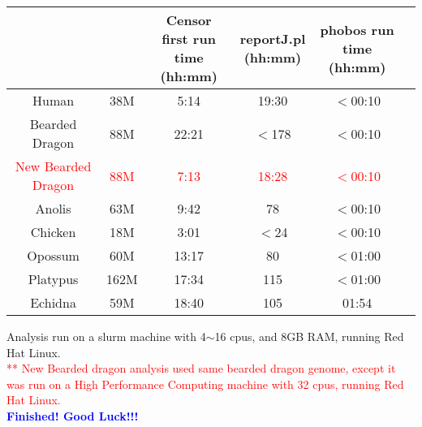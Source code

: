 \documentclass[12pt]{article}
\begin{document}
\footnotesize  %
\setlength\tabcolsep{1.5pt}
\begin{center}
	\begin{tabular}{ | c | c | c | c| c |c|}
		\hline
		\thead{Genome}	& 	\thead{Consensus sequences size}	&	\thead{Censor first run \\ time (hh:mm)}	&	\thead{reportJ.pl \\ (hh:mm)}	&	\thead{phobos run time \\ (hh:mm)} \\
		\hline
		Human	&	38M	&	5:14	&	19:30	&	$<$00:10 \\
		\hline 
		Bearded Dragon	&	88M	&	22:21	&	$<$178	&	$<$00:10 \\
		\hline
		\textcolor{red}{New Bearded Dragon}	&	\textcolor{red}{88M}	&	\textcolor{red}{7:13}	&	\textcolor{red}{18:28}	&	\textcolor{red}{$<$00:10} \\
		\hline
		Anolis	&	63M	&	9:42	&	78	&	$<$00:10 \\
		\hline
		Chicken	&	18M	&	3:01	&	$<$24	&	$<$00:10 \\
		\hline
		Opossum	&	60M	&	13:17	&	80	&	$<$01:00 \\
		\hline
		Platypus	&	162M	&	17:34	&	115	&	$<$01:00 \\
		\hline
		Echidna	&	59M	&	18:40	&	105	&	01:54 \\
		\hline
	\end{tabular}
\end{center}

\noindent * Analysis run on a slurm machine with 4$\sim$16 cpus, and 8GB RAM, running Red Hat Linux.\\
\textcolor{red}{** New Bearded dragon analysis used same bearded dragon genome, except it was run on a High Performance Computing machine with 32 cpus, running Red Hat Linux.} \\

\textbf{\textcolor{blue}{ \Large Finished! Good Luck!!!}}
\end{document}
